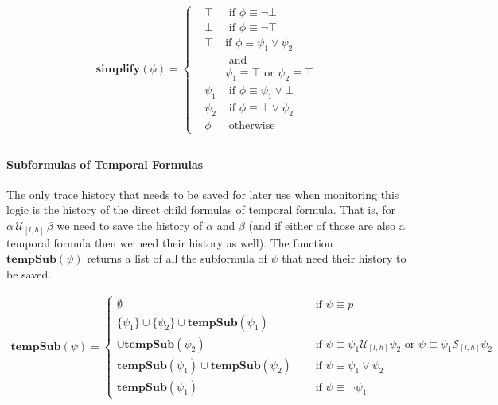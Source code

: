 \documentclass[]{llncs}
\begin{document}
\begin{align*}
\mathbf{simplify}(\phi) = \left\{
\begin{aligned}
&\top &\text{ if } \phi \equiv \neg \bot \\
&\bot &\text{ if } \phi \equiv \neg \top \\
&\top &\text {if } \phi \equiv \psi_1 \vee \psi_2 \\
& &\text{ and } \\ & & \psi_1 \equiv \top \text{ or } \psi_2 \equiv \top \\
&\psi_1 &\text{ if } \phi \equiv \psi_1 \vee \bot \\
&\psi_2 &\text{ if } \phi \equiv \bot \vee \psi_2 \\
&\phi &\text{ otherwise}
\end{aligned} \right. \\
\end{align*}

\paragraph{Subformulas of Temporal Formulas}
The only trace history that needs to be saved for later use when monitoring this logic is the history of the direct child formulas of temporal formula. That is, for $\alpha\, \mathcal{U}_{[l,h]}\, \beta$ we need to save the history of $\alpha$ and $\beta$ (and if either of those are also a temporal formula then we need their history as well). The function $\mathbf{tempSub}(\psi)$ returns a list of all the subformula of $\psi$ that need their history to be saved.

\begin{align*}
\mathbf{tempSub}(\psi) = \left\lbrace
\begin{aligned}
\emptyset & \quad \text{ if } \psi \equiv p \\
\{\psi_1\} \cup \{\psi_2\} \cup \mathbf{tempSub}(\psi_1) \\
\cup \mathbf{tempSub}(\psi_2) & \quad \text{ if } \psi \equiv \psi_1 \mathcal{U}_{[l,h]} \psi_2 \text{ or } \psi \equiv \psi_1 \mathcal{S}_{[l,h]} \psi_2 \\
\mathbf{tempSub}(\psi_1) \cup \mathbf{tempSub}(\psi_2) & \quad \text{ if } \psi \equiv \psi_1 \vee \psi_2 \\
\mathbf{tempSub}(\psi_1) & \quad \text{ if } \psi \equiv \neg \psi_1
\end{aligned} \right.
\end{align*}
\end{document}
